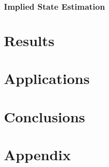 \documentclass[11pt,a4paper,notitlepage]{article}
\numberwithin{equation}{section}
\begin{document}


\subsubsection{Implied State Estimation}


\section{Results}

\section{Applications}

\section{Conclusions}

\newpage



\nocite{*}


\newpage
\section*{Appendix} 
\end{document}
